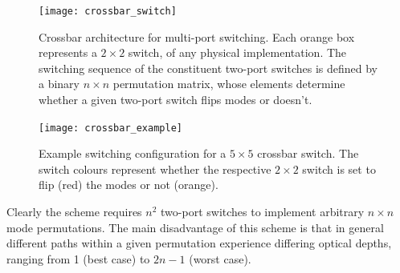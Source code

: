 \begin{figure}[!htbp]
\texttt{[image: crossbar\_switch]}
\captionspacefig \caption{Crossbar architecture for multi-port switching. Each orange box represents a \mbox{$2\times 2$} switch, of any physical implementation. The switching sequence of the constituent two-port switches is defined by a binary \mbox{$n\times n$} permutation matrix, whose elements determine whether a given two-port switch flips modes or doesn't.} \label{fig:crossbar_switch}	
\end{figure}

\begin{figure}[!htbp]
\texttt{[image: crossbar\_example]}
\captionspacefig \caption{Example switching configuration for a \mbox{$5\times 5$} crossbar switch. The switch colours represent whether the respective \mbox{$2\times 2$} switch is set to flip (red) the modes or not (orange).} \label{fig:crossbar_example}	
\end{figure}

Clearly the scheme requires $n^2$ two-port switches to implement arbitrary \mbox{$n\times n$} mode permutations. The main disadvantage of this scheme is that in general different paths within a given permutation experience differing optical depths, ranging from 1 (best case) to \mbox{$2n-1$} (worst case).